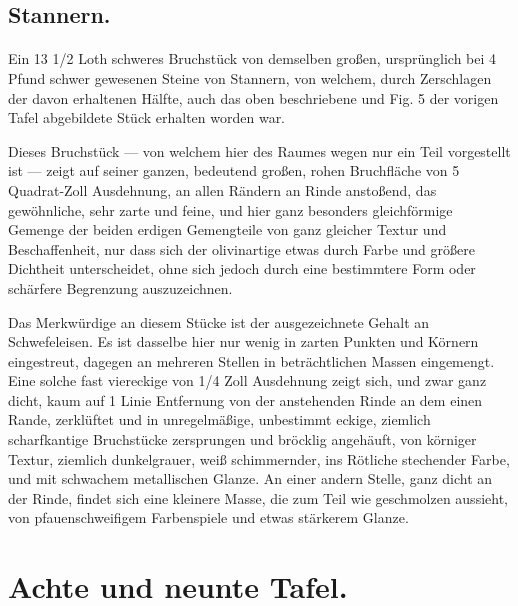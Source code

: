 \documentclass[a4paper, 11pt, oneside, german]{article}
\begin{document}
\subsection{Stannern.}
\paragraph{}
Ein 13 1/2 Loth schweres Bruchstück von demselben großen, ursprünglich bei 4 Pfund schwer gewesenen Steine von Stannern, von welchem, durch Zerschlagen der davon erhaltenen Hälfte, auch das oben beschriebene und Fig. 5 der vorigen Tafel abgebildete Stück erhalten worden war.

Dieses Bruchstück --- von welchem hier des Raumes wegen nur ein Teil vorgestellt ist --- zeigt auf seiner ganzen, bedeutend großen, rohen Bruchfläche von 5 Quadrat-Zoll Ausdehnung, an allen Rändern an Rinde anstoßend, das gewöhnliche, sehr zarte und feine, und hier ganz besonders gleichförmige Gemenge der beiden erdigen Gemengteile von ganz gleicher Textur und Beschaffenheit, nur dass sich der olivinartige etwas durch Farbe und größere Dichtheit unterscheidet, ohne sich jedoch durch eine bestimmtere Form oder schärfere Begrenzung auszuzeichnen.

Das Merkwürdige an diesem Stücke ist der ausgezeichnete Gehalt an Schwefeleisen. Es ist dasselbe hier nur wenig in zarten Punkten und Körnern eingestreut, dagegen an mehreren Stellen in beträchtlichen Massen eingemengt. Eine solche fast viereckige von 1/4 Zoll Ausdehnung zeigt sich, und zwar ganz dicht, kaum auf 1 Linie Entfernung von der anstehenden Rinde an dem einen Rande, zerklüftet und in unregelmäßige, unbestimmt eckige, ziemlich scharfkantige Bruchstücke zersprungen und bröcklig angehäuft, von körniger Textur, ziemlich dunkelgrauer, weiß schimmernder, ins Rötliche stechender Farbe, und mit schwachem metallischen Glanze. An einer andern Stelle, ganz dicht an der Rinde, findet sich eine kleinere Masse, die zum Teil wie geschmolzen aussieht, von pfauenschweifigem Farbenspiele und etwas stärkerem Glanze.
\clearpage
\section{Achte und neunte Tafel.}
\end{document}
